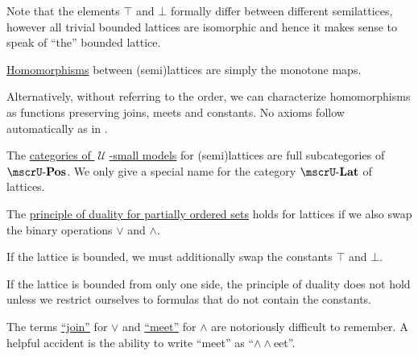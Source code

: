 \begin{definition}
\begin{thmenum}[resume=def:semilattice]
    Note that the elements \( \top \) and \( \bot \) formally differ between different semilattices, however all trivial bounded lattices are isomorphic and hence it makes sense to speak of \enquote{the} bounded lattice.

     \hyperref[def:first_order_homomorphism]{Homomorphisms} between (semi)lattices are simply the monotone maps.

    Alternatively, without referring to the order, we can characterize homomorphisms as functions preserving joins, meets and constants. No axioms follow automatically as in .

     The \hyperref[def:category_of_small_first_order_models]{categories of \( \mscrU \)-small models} for (semi)lattices are full subcategories of \hyperref[def:partially_ordered_set/category]{\( \ucat{Pos} \)}. We only give a special name for the category \( \ucat{Lat} \) of lattices.

     The \hyperref[def:partially_ordered_set/opposite]{principle of duality for partially ordered sets} holds for lattices if we also swap the binary operations \( \vee \) and \( \wedge \).

    If the lattice is bounded, we must additionally swap the constants \( \top \) and \( \bot \).

    If the lattice is bounded from only one side, the principle of duality does not hold unless we restrict ourselves to formulas that do not contain the constants.
  \end{thmenum}
\end{definition}

\begin{remark}\label{rem:lattice_operation_etymology}
  The terms \hyperref[def:semilattice/join]{\enquote{join}} for \( \vee \) and \hyperref[def:semilattice/meet]{\enquote{meet}} for \( \wedge \) are notoriously difficult to remember. A helpful accident is the ability to write \enquote{meet} as \enquote{\( \wedge \wedge \)eet}.
\end{remark}

